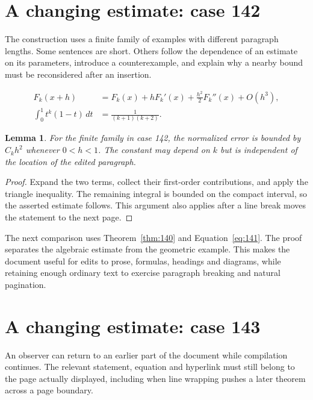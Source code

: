\documentclass[a4paper,10pt]{article}
\newtheorem{lemma}[theorem]{Lemma}
\begin{document}
\lipsum[3]

\section{A changing estimate: case 142}\label{unit:141}
The construction uses a finite family of examples with different paragraph lengths. Some sentences are short. Others follow the dependence of an estimate on its parameters, introduce a counterexample, and explain why a nearby bound must be reconsidered after an insertion.

\lipsum[4-5]
\begin{align}\label{eq:141}
 F_k(x+h)&=F_k(x)+hF_k'(x)+\frac{h^2}{2}F_k''(x)+O(h^3),\\
 \int_0^1 t^k(1-t)\,dt&=\frac{1}{(k+1)(k+2)}.
\end{align}
\begin{lemma}\label{thm:141}
For the finite family in case 142, the normalized error is bounded by $C_k h^2$ whenever $0<h<1$. The constant may depend on $k$ but is independent of the location of the edited paragraph.
\end{lemma}
\begin{proof}
Expand the two terms, collect their first-order contributions, and apply the
triangle inequality. The remaining integral is bounded on the compact interval,
so the asserted estimate follows. This argument also applies after a line break
moves the statement to the next page.
\end{proof}
\begin{center}
\end{center}
The next comparison uses Theorem~\ref{thm:140} and Equation~\ref{eq:141}. The proof separates the algebraic estimate from the geometric example. This makes the document useful for edits to prose, formulas, headings and diagrams, while retaining enough ordinary text to exercise paragraph breaking and natural pagination.

\lipsum[8]

\section{A changing estimate: case 143}\label{unit:142}
An observer can return to an earlier part of the document while compilation continues. The relevant statement, equation and hyperlink must still belong to the page actually displayed, including when line wrapping pushes a later theorem across a page boundary.
\end{document}
